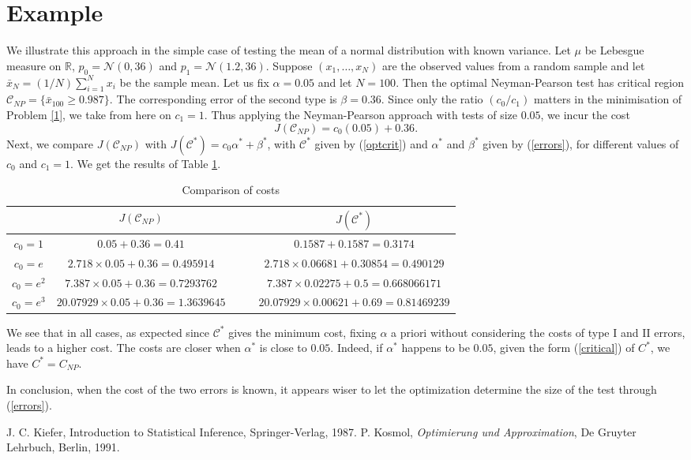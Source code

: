 \documentclass[preprint,aps,showkeys,12pt]{revtex4}
\begin{document}
\section{Example}
We illustrate this approach in the simple case of testing the mean of a normal distribution with known variance. Let $\mu$ be Lebesgue measure on ${\mathbb{R}}$, $p_0=\mathcal N (0,36)$ and $p_1=\mathcal N(1.2,36)$. Suppose $(x_1,\ldots,x_N)$ are the observed values from a random sample  and let $\bar{x}_N=(1/N)\sum_{i=1}^Nx_i$ be the sample mean. Let us fix $\alpha=0.05$ and let $N=100$. Then the optimal Neyman-Pearson test has critical region $\mathcal C _{NP}=\{\bar{x}_{100}\ge 0.987\}$. The corresponding error of the second type is $\beta=0.36$. Since only the ratio $(c_0/c_1)$ matters in the minimisation of Problem \ref{1}, we take from here on $c_1=1$. Thus applying the Neyman-Pearson approach with tests of size $0.05$, we incur the cost
$$J(\mathcal C _{NP})=c_0 (0.05)+0.36.
$$
Next, we compare $J(\mathcal C _{NP})$ with $J(\mathcal C^*)=c_0\alpha^*+\beta^*$, with $\mathcal C^*$ given by (\ref{optcrit}) and $\alpha^*$ and $\beta^*$ given by (\ref{errors}), for different values of $c_0$ and $c_1=1$. We get the results of Table \ref{costs}.

\begin{table}[ht]
\caption{Comparison of costs}
\centering
\begin{tabular}{c|cccc}
\hline\hline
&$J(\mathcal C _{NP})$& & &$J(\mathcal C^*)$\\
\hline
$c_0=1$&$0.05+0.36=0.41$& & &$0.1587+0.1587=0.3174$\\
 $c_0=e$&$2.718\times 0.05+0.36=0.495914$& & &$2.718\times 0.06681+0.30854=0.490129$\\
 $c_0=e^2$&$7.387\times 0.05+0.36=0.7293762$& & & $7.387\times 0.02275+0.5=0.668066171$\\
 $c_0=e^3$&$20.07929\times 0.05+0.36=1.3639645$& & & $20.07929\times 0.00621 + 0.69=0.81469239$\\[1ex]
 \hline
\end{tabular}
\label{costs}
\end{table}
We see that in all cases, as expected since $\mathcal C^*$ gives the minimum cost, fixing $\alpha$ a priori without considering the costs of type I and II errors, leads to a higher cost. The costs are closer when $\alpha^*$ is close to $0.05$. Indeed, if $\alpha^*$ happens to be $0.05$, given the form (\ref{critical}) of $C^*$, we have $C^*=C_{NP}$.

 In conclusion, when the cost of the two errors is known, it appears wiser to let the optimization  determine the size of the test through (\ref{errors}).

\begin{thebibliography}{1}

	
 J. C. Kiefer, Introduction to Statistical Inference, Springer-Verlag, 1987.
P.  Kosmol, {\em Optimierung und Approximation}, De Gruyter
Lehrbuch, Berlin, 1991.

	
	
\end{thebibliography}
\end{document}
